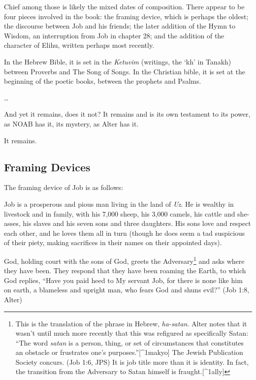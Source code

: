 Chief among those is likely the mixed dates of composition. There appear to be four pieces involved in the book: the framing device, which is perhaps the oldest; the discourse between Job and his friends; the later addition of the Hymn to Wisdom, an interruption from Job in chapter 28; and the addition of the character of Elihu, written perhaps most recently.

In the Hebrew Bible, it is set in the \emph{Ketuvim} (writings, the `kh' in Tanakh) between Proverbs and The Song of Songs. In the Christian bible, it is set at the beginning of the poetic books, between the prophets and Psalms.

\ldots{}

And yet it remains, does it not? It remains and is its own testament to its power, as NOAB has it, its mystery, as Alter has it.

It remains.

\hypertarget{framing-devices}{%
\subsection*{Framing Devices}\label{framing-devices}}

The framing device of Job is as follows:

Job is a prosperous and pious man living in the land of \emph{Uz}. He is wealthy in livestock and in family, with his 7,000 sheep, his 3,000 camels, his cattle and she-asses, his slaves and his seven sons and three daughters. His sons love and respect each other, and he loves them all in turn (though he does seem a tad suspicious of their piety, making sacrifices in their names on their appointed days).

God, holding court with the sons of God, greets the Adversary\footnote{This is the translation of the phrase in Hebrew, \emph{ha-satan}. Alter notes that it wasn't until much more recently that this was refigured as specifically Satan: ``The word \emph{satan} is a person, thing, or set of circumstances that constitutes an obstacle or frustrates one's purposes.''{[}\^{}1makyo{]} \parencite[466]{alter} The Jewish Publication Society concurs. (Job 1:6, JPS) It is job title more than it is identity. In fact, the transition from the Adversary to Satan himself is fraught.{[}\^{}1ally{]}} and asks where they have been. They respond that they have been roaming the Earth, to which God replies, ``Have you paid heed to My servant Job, for there is none like him on earth, a blameless and upright man, who fears God and shuns evil?'' (Job 1:8, Alter)

